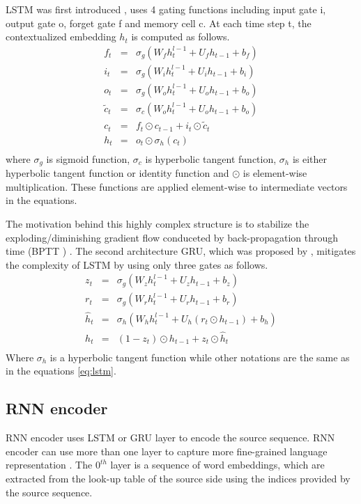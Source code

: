 LSTM was first introduced \cite{Hochreiter97long}, uses 4 gating functions including input gate i, output gate o, forget gate f and memory cell c. At each time step t, the contextualized embedding $h_t$ is computed as follows.
\begin{equation}
\label{eq:lstm}
\begin{array}{rcl}
f_t &=& \sigma_g (W_f h^{l-1}_t + U_f h_{t-1} + b_f)\\
i_t &=& \sigma_g (W_i h^{l-1}_t + U_i h_{t-1} + b_i)\\
o_t &=& \sigma_g (W_o h^{l-1}_t + U_o h_{t-1} + b_o)\\
\tilde{c}_t &=& \sigma_c (W_o h^{l-1}_t + U_o h_{t-1} + b_o)\\
c_t &=& f_t \odot c_{t-1} + i_t \odot \tilde{c}_t\\
h_t &=& o_t \odot \sigma_h(c_t)\\
\end{array}
\end{equation}
where $\sigma_g$ is sigmoid function, $\sigma_c$ is hyperbolic tangent function, $\sigma_h$ is either hyperbolic tangent function or identity function and $\odot$ is element-wise multiplication. These functions are applied element-wise to intermediate vectors in the equations.

The motivation behind this highly complex structure is to stabilize the exploding/diminishing gradient flow \citep{Pascanu13onthe} conduceted by back-propagation through time (BPTT ) \cite{Hochreiter97long}. The second architecture GRU, which was proposed by \cite{Cho14properties}, mitigates the complexity of LSTM by using only three gates as follows.
\begin{equation}
\label{eq:gru}
\begin{array}{rcl}
z_t &=& \sigma_g (W_z h^{l-1}_t + U_z h_{t-1} + b_z)\\
r_t &=& \sigma_g (W_r h^{l-1}_t + U_r h_{t-1} + b_r)\\
\hat{h}_t &=& \sigma_h (W_h h^{l-1}_t + U_h (r_t \odot h_{t-1}) + b_h)\\
h_t &=& (1-z_t)\odot h_{t-1} + z_t \odot \hat{h}_t\\
\end{array}
\end{equation}
Where $\sigma_h$ is a hyperbolic tangent function while other notations are the same as in the equations \ref{eq:lstm}.
\subsection{RNN encoder}
RNN encoder uses LSTM or GRU layer to encode the source sequence. RNN encoder can use more than one layer to capture more fine-grained language representation \cite{Li20shallow}. The $0^{th}$ layer is a sequence of word embeddings, which are extracted from the look-up table of the source side using the indices provided by the source sequence. 

